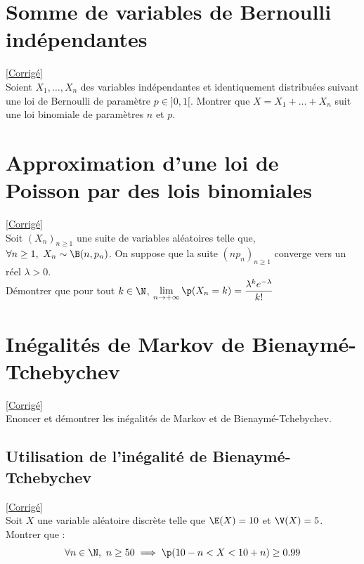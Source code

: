 \documentclass[8pt]{book}
\begin{document}
\section{Somme de variables de Bernoulli indépendantes }
\label{Somme de variables de Bernoulli indépedantes}
\textcolor{blue}{\hyperref[Somme de variables de Bernoulli indépendantes corrigé]{[Corrigé]}}\\
Soient $X_1,\dots,X_n$ des variables indépendantes et identiquement distribuées suivant une loi de Bernoulli de paramètre $p\in]0,1[$. Montrer que $X=X_1+\dots+X_n$ suit une loi binomiale de paramètres $n$ et $p$.

\section{Approximation d'une loi de Poisson par des lois binomiales }
\label{Approximation d'une loi de Poisson par des lois binomiales}
\textcolor{blue}{\hyperref[Approximation de la loi de Poisson par des lois binomiales corrigé]{[Corrigé]}}\\
Soit $(X_n)_{n\geq1}$ une suite de variables aléatoires telle que, $\forall n\geq1,\ X_n\sim\B(n,p_n)$. On suppose que la suite $(np_n)_{n\geq1}$ converge vers un réel $\lambda>0$.
\\ Démontrer que pour tout $k\in\N$, $\lim\limits_{n\to +\infty}\p(X_n=k)=\displaystyle\frac{\lambda^ke^{-\lambda}}{k!}$

\section{Inégalités de Markov de Bienaymé-Tchebychev }
\label{Inégalités de Markov et de Bienaymé-Tchebychev}
\textcolor{blue}{\hyperref[Inégalités de Markov et de Bienaymé-Tchebychev corrigé]{[Corrigé]}}\\
Enoncer et démontrer les inégalités de Markov et de Bienaymé-Tchebychev.

\subsection{Utilisation de l'inégalité de Bienaymé-Tchebychev}
\label{Utilisation de l'inégalité de Bienaymé-Tchebychev}
\textcolor{blue}{\hyperref[Utilisation de l'inégalité de Bienaymé-Tchebychev corrigé]{[Corrigé]}}\\
Soit $X$ une variable aléatoire discrète telle que  $\E(X)=10$ et $\V(X)=5$. Montrer que :
$$\forall n\in\N,\ n\geq 50 \implies \p(10-n< X<10+n)\geq 0.99$$
\end{document}
